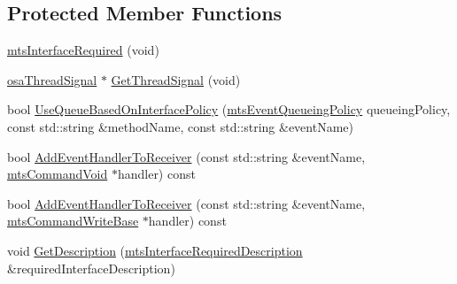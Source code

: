 \subsection*{Protected Member Functions}
\begin{DoxyCompactItemize}
\item 
\hyperlink{classmts_interface_required_a3394011d351fabdfa7f341f0e6ac36bb}{mts\-Interface\-Required} (void)
\item 
\hyperlink{classosa_thread_signal}{osa\-Thread\-Signal} $\ast$ \hyperlink{classmts_interface_required_a00d93a0e2b605cfbd6251a4c29571bc7}{Get\-Thread\-Signal} (void)
\item 
bool \hyperlink{classmts_interface_required_a4a8befde3210e2786e915a16f6ecf2c7}{Use\-Queue\-Based\-On\-Interface\-Policy} (\hyperlink{mts_forward_declarations_8h_a9286ac2ca46e5bcd57059550faa96916}{mts\-Event\-Queueing\-Policy} queueing\-Policy, const std\-::string \&method\-Name, const std\-::string \&event\-Name)
\item 
bool \hyperlink{classmts_interface_required_a874737df36144428d0543bf3fdcbf079}{Add\-Event\-Handler\-To\-Receiver} (const std\-::string \&event\-Name, \hyperlink{classmts_command_void}{mts\-Command\-Void} $\ast$handler) const 
\item 
bool \hyperlink{classmts_interface_required_a59745eecdc6ee2dedd5779cff379bfed}{Add\-Event\-Handler\-To\-Receiver} (const std\-::string \&event\-Name, \hyperlink{classmts_command_write_base}{mts\-Command\-Write\-Base} $\ast$handler) const 
\item 
void \hyperlink{classmts_interface_required_abc1c41cecdfa6d2970bafd9bd11d57ed}{Get\-Description} (\hyperlink{classmts_interface_required_description}{mts\-Interface\-Required\-Description} \&required\-Interface\-Description)
\end{DoxyCompactItemize}
